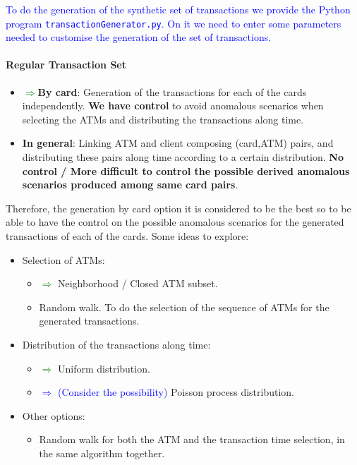 \documentclass{article}
\begin{document}
\textcolor{blue}{To do the generation of the synthetic set of transactions we provide the Python program \texttt{transactionGenerator.py}. On it we need to enter some parameters needed to customise the generation of the set of transactions.}

\paragraph{Regular Transaction Set\\}

\begin{tcolorbox}
  \begin{itemize}
    \item \textcolor{green}{$\Rightarrow$}\textbf{By card}: Generation of the transactions for each of the cards independently. \textbf{We have
    control} to avoid anomalous scenarios when selecting the ATMs and distributing the transactions along time.
    \item \textbf{In general}: Linking ATM and client composing (card,ATM) pairs, and distributing these pairs along
    time according to a certain distribution. \textbf{No control / More difficult to control the possible derived
    anomalous scenarios produced among same card pairs}.
  \end{itemize}
\end{tcolorbox}

Therefore, the generation by card option it is considered to be the best so to be able to have the control
on the possible anomalous scenarios for the generated transactions of each of the cards. Some ideas to explore:

\begin{itemize}
  \item Selection of ATMs:
  \begin{itemize}
    \item \textcolor{green}{$\Rightarrow$} Neighborhood / Closed ATM subset.
    \item Random walk. To do the selection of the sequence of ATMs for the generated transactions.
  \end{itemize}
  \item Distribution of the transactions along time:
  \begin{itemize}
    \item \textcolor{green}{$\Rightarrow$} Uniform distribution.
    \item \textcolor{blue}{$\Rightarrow$ (Consider the possibility)} Poisson process distribution.
  \end{itemize}
  \item Other options:
  \begin{itemize}
    \item Random walk for both the ATM and the transaction time selection, in the same algorithm together.
  \end{itemize}
\end{itemize}
\end{document}
